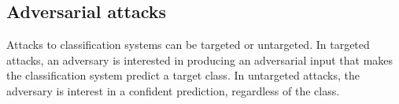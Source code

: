 \subsection{Adversarial attacks}
Attacks to classification systems can be targeted or untargeted. In targeted attacks, an adversary is interested in producing an adversarial input that makes the classification system predict a target class. In untargeted attacks, the adversary is interest in a confident prediction, regardless of the class.
